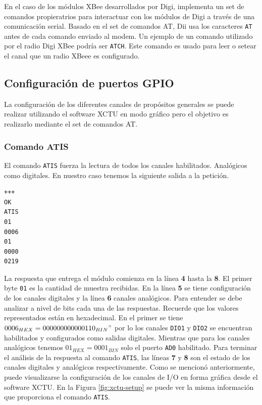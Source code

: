 \documentclass[11pt,oneside,spanish,a4paper]{article}
\begin{document}
En el caso de los módulos XBee desarrollados por Digi, implementa un
set de comandos propieratrios para interactuar con los módulos de
Digi a través de una comunicación serial. Basado en el set de comandos
AT, Dii usa los caracteres \texttt{AT} antes de cada comando enviado
al modem. Un ejemplo de un comando utilizado por el radio Digi XBee
podría ser \texttt{ATCH}. Este comando es usado para leer o setear el
canal que un radio XBeee es configurado\cite{at-cmds}.

\subsection{Configuración de puertos GPIO}
\label{sec:config-at}

La configuración de los diferentes canales de propósitos generales se
puede realizar utilizando el software XCTU en modo gráfico pero el
objetivo es realizarlo mediante el set de comandos AT. 

\subsubsection{Comando ATIS}
\label{sec:atis}

El comando \texttt{ATIS} fuerza la lectura de todos los canales
habilitados. Analógicos como digitales. En nuestro caso tenemos la
siguiente salida a la petición.

\begin{lstlisting}[emph={+++,ATIS}, emphstyle={\color{blue}}]
+++
OK
ATIS
01
0006
01
0000
0219
\end{lstlisting}

La respuesta que entrega el módulo comienza en la línea \textbf{4}
hasta la \textbf{8}. El primer byte \texttt{01} es la cantidad de
muestra recibidas. En la línea \textbf{5} se tiene configuración de
los canales digitales y la línea \textbf{6} canales analógicos. Para
entender se debe analizar a nivel de bits cada una de las
respuestas. Recuerde que los valores representados están en
hexadecimal. En el primer se tiene $0006_{HEX} =
000000000000110_{BIN}"$ por lo los canales \texttt{DIO1} y
\texttt{DIO2} se encuentran habilitados y configurados como salidas
digitales. Mientras que para los canales analógicos tenemos
$01_{HEX} = 0001_{BIN}$ solo el puerto \texttt{AD0} habilitado. Para
terminar el análisis de la respuesta al comando \texttt{ATIS}, las
líneas \textbf{7} y \textbf{8} son el estado de los canales
digitales y analógicos respectivamente. Como se mencionó
anteriormente, puede visualizarse la configuración de los canales de
I/O en forma gráfica desde el software XCTU. En la Figura
\ref{fig:xctu-setup} se puede ver la misma información que
proporciona el comando \texttt{ATIS}.
\end{document}
